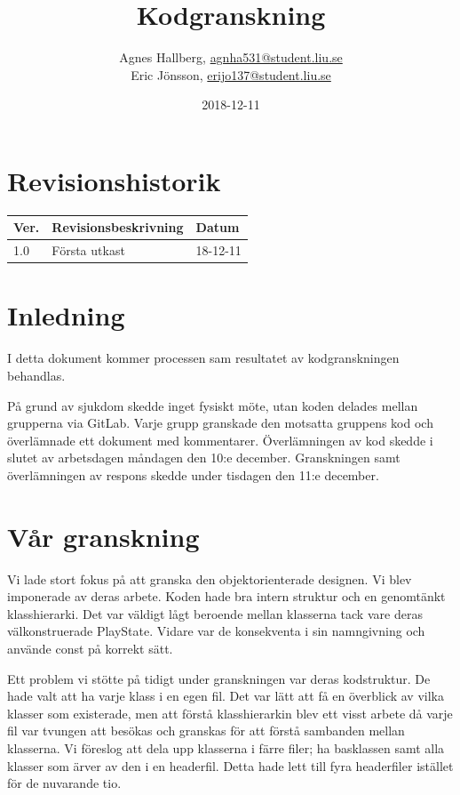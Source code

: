 \documentclass{TDP005mall}
\author{Agnes Hallberg, \url{agnha531@student.liu.se}\\
  Eric Jönsson, \url{erijo137@student.liu.se}}
\title{Kodgranskning}
\date{2018-12-11}
\begin{document}
\projectpage

\section*{Revisionshistorik}
\begin{table}[!h]
\begin{tabularx}{\linewidth}{|l|X|l|}
\hline
Ver. & Revisionsbeskrivning & Datum \\\hline
1.0 & Första utkast  & 18-12-11 \\\hline
\end{tabularx}
\end{table}

\section{Inledning}
I detta dokument kommer processen sam resultatet av kodgranskningen behandlas.

På grund av sjukdom skedde inget fysiskt möte, utan koden delades mellan grupperna via GitLab. Varje grupp granskade den motsatta gruppens kod och överlämnade ett dokument med kommentarer. Överlämningen av kod skedde i slutet av arbetsdagen måndagen den 10:e december. Granskningen samt överlämningen av respons skedde under tisdagen den 11:e december.

\section{Vår granskning}
Vi lade stort fokus på att granska den objektorienterade designen. Vi blev imponerade av deras arbete. Koden hade bra intern struktur och en genomtänkt klasshierarki. Det var väldigt lågt beroende mellan klasserna tack vare deras välkonstruerade PlayState. Vidare var de konsekventa i sin namngivning och använde const på korrekt sätt.

Ett problem vi stötte på tidigt under granskningen var deras kodstruktur. De hade valt att ha varje klass i en egen fil. Det var lätt att få en överblick av vilka klasser som existerade, men att förstå klasshierarkin blev ett visst arbete då varje fil var tvungen att besökas och granskas för att förstå sambanden mellan klasserna. Vi föreslog att dela upp klasserna i färre filer; ha basklassen samt alla klasser som ärver av den i en headerfil. Detta hade lett till fyra headerfiler istället för de nuvarande tio.
\end{document}
